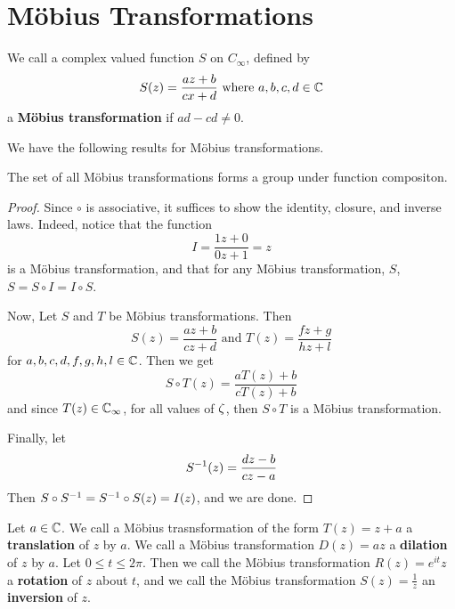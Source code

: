 \section{M\"obius Transformations}

\begin{definition}
    We call a complex valued function $S$ on $C_\infty$, defined by
    \begin{equation*}
        S(z)=\frac{az+b}{cx+d} \text{ where } a,b,c,d \in \mathbb{C}
    \end{equation*}
    a \textbf{M\"obius transformation} if $ad-cd \neq 0$.
\end{definition}

We have the following results for M\"obius transformations.

\begin{theorem}\label{3.3.1}
    The set of all M\"obius transformations forms a group under function
    compositon.
\end{theorem}
\begin{proof}
    Since $\circ$ is associative, it suffices to show the identity, closure, and
    inverse laws. Indeed, notice that the function
    \begin{equation*}
        I=\frac{1z+0}{0z+1}=z
    \end{equation*}
    is a M\"obius transformation, and that for any M\"obius transformation, $S$,
    $S=S \circ I=I \circ S$.

    Now, Let $S$ and $T$ be M\"obius transformations. Then
    \begin{equation*}
        S(z)=\frac{az+b}{cz+d} \text{ and } T(z)=\frac{fz+g}{hz+l}
    \end{equation*}
    for $a,b,c,d,f,g,h,l \in \mathbb{C}$. Then we get
    \begin{equation*}
        S \circ T(z)=\frac{aT(z)+b}{cT(z)+b}
    \end{equation*}
    and since $T(z) \in \mathbb{C}_\infty$, for all values of $\zeta$, then $S \circ T$ is a
    M\"obius transformation.

    Finally, let
    \begin{equation*}
        S^{-1}(z)=\frac{dz-b}{cz-a}
    \end{equation*}
    Then $S \circ S^{-1}=S^{-1} \circ S(z)=I(z)$, and we are done.
\end{proof}

\begin{definition}
    Let $a \in \mathbb{C}$. We call a M\"obius trasnsformation of the form $T(z)=z+a$ a
    \textbf{translation} of $z$ by  $a$. We call a M\"obius transformation
    $D(z)=az$ a \textbf{dilation} of $z$ by  $a$.  Let $0 \leq t \leq 2\pi$.
    Then we call the M\"obius transformation  $R(z)=e^{it}z$ a \textbf{rotation}
    of $z$ about  $t$, and we call the M\"obius transformation
    $S(z)=\frac{1}{z}$ an \textbf{inversion} of $z$.
\end{definition}

